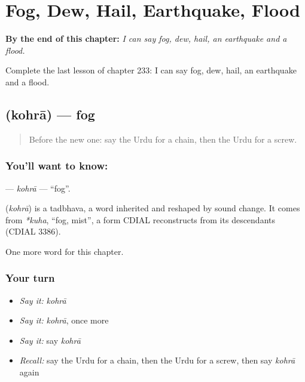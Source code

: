 
\chapter{Fog, Dew, Hail, Earthquake, Flood}
\label{ch:ur-fog-dew-hail-earthquake-flood}

\begin{chapteropening}
\textbf{By the end of this chapter:} \emph{I can say fog, dew, hail, an earthquake and a flood.}

Complete the last lesson of chapter 233: I can say fog, dew, hail, an earthquake and a flood.
\end{chapteropening}

\section[\texorpdfstring{\ur{کہرا} (kohrā)}{کہرا (kohrā)}]{ (kohrā) — fog}

\label{lesson:UR-C233-kohra}



\begin{quote}
Before the new one: say the Urdu for a chain, then the Urdu for a screw.
\end{quote}

\subsection*{You'll want to know: }
\textbf{} — \emph{kohrā} — \textquotedblleft{}fog\textquotedblright{}.

\begin{cousinweb}
\textbf{} (\emph{kohrā}) is a tadbhava, a word inherited and reshaped by sound change. It comes from \emph{*kuha}, \textquotedblleft{}fog, mist\textquotedblright{}, a form CDIAL reconstructs from its descendants (CDIAL 3386).
\end{cousinweb}

\begin{grammarlens}[title={What you've built}]
One more word for this chapter.
\end{grammarlens}

\subsection*{Your turn}
\begin{itemize}
\raggedright
  \item \emph{Say it:} \emph{kohrā}
  \item \emph{Say it:} \emph{kohrā}, once more
  \item \emph{Say it:} say \emph{kohrā}
  \item \emph{Recall:} say the Urdu for a chain, then the Urdu for a screw, then say \emph{kohrā} again
\end{itemize}

